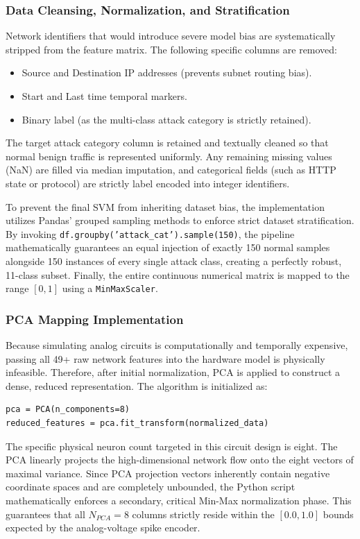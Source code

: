 \documentclass{ieeeaccess}
\begin{document}
\subsubsection{Data Cleansing, Normalization, and Stratification}
Network identifiers that would introduce severe model bias are systematically stripped from the feature matrix. The following specific columns are removed:
\begin{itemize}
\item Source and Destination IP addresses (prevents subnet routing bias).
\item Start and Last time temporal markers.
\item Binary label (as the multi-class attack category is strictly retained).
\end{itemize}

The target attack category column is retained and textually cleaned so that normal benign traffic is represented uniformly. Any remaining missing values (NaN) are filled via median imputation, and categorical fields (such as HTTP state or protocol) are strictly label encoded into integer identifiers. 

To prevent the final SVM from inheriting dataset bias, the implementation utilizes Pandas' grouped sampling methods to enforce strict dataset stratification. By invoking \texttt{df.groupby('attack\_cat').sample(150)}, the pipeline mathematically guarantees an equal injection of exactly 150 normal samples alongside 150 instances of every single attack class, creating a perfectly robust, 11-class subset. Finally, the entire continuous numerical matrix is mapped to the range $[0, 1]$ using a \texttt{MinMaxScaler}.

\subsubsection{PCA Mapping Implementation}

Because simulating analog circuits is computationally and temporally expensive, passing all 49+ raw network features into the hardware model is physically infeasible. Therefore, after initial normalization, PCA is applied to construct a dense, reduced representation. The algorithm is initialized as:
\begin{verbatim}
pca = PCA(n_components=8)
reduced_features = pca.fit_transform(normalized_data)
\end{verbatim}

The specific physical neuron count targeted in this circuit design is eight. The PCA linearly projects the high-dimensional network flow onto the eight vectors of maximal variance. Since PCA projection vectors inherently contain negative coordinate spaces and are completely unbounded, the Python script mathematically enforces a secondary, critical Min-Max normalization phase. This guarantees that all $N_{PCA}=8$ columns strictly reside within the $[0.0, 1.0]$ bounds expected by the analog-voltage spike encoder. 
\end{document}
